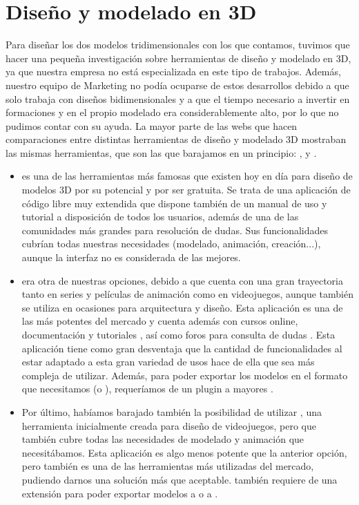 \documentclass{subfiles}
\begin{document}
  \chapter{Diseño y modelado en 3D}
  \label{chap:4}

    Para diseñar los dos modelos tridimensionales con los que contamos, tuvimos que hacer una pequeña investigación sobre herramientas de diseño y modelado en 3D, ya que nuestra empresa no está especializada en este tipo de trabajos. Además, nuestro equipo de Marketing no podía ocuparse de estos desarrollos debido a que solo trabaja con diseños bidimensionales y a que el tiempo necesario a invertir en formaciones y en el propio modelado era considerablemente alto, por lo que no pudimos contar con su ayuda. La mayor parte de las webs que hacen comparaciones entre distintas herramientas de diseño y modelado 3D mostraban las mismas herramientas, que son las que barajamos en un principio: \blender \cite{web:blender}, \unreal \cite{web:unreal} y \unity \cite{web:unity}.

    \begin{itemize}
        \item \textbf{\blender} es una de las herramientas más famosas que existen hoy en día para diseño de modelos 3D por su potencial y por ser gratuita. Se trata de una aplicación de código libre muy extendida que dispone también de un manual de uso y tutorial \cite{web:blender_manual} a disposición de todos los usuarios, además de una de las comunidades más grandes para resolución de dudas. Sus funcionalidades cubrían todas nuestras necesidades (modelado, animación, creación...), aunque la interfaz no es considerada de las mejores.
        
        \item \textbf{\unreal} era otra de nuestras opciones, debido a que cuenta con una gran trayectoria tanto en series y películas de animación como en videojuegos, aunque también se utiliza en ocasiones para arquitectura y diseño. Esta aplicación es una de las más potentes del mercado y cuenta además con cursos online, documentación y tutoriales \cite{web:unreal_learn}, así como foros para consulta de dudas \cite{web:unreal_forum}. Esta aplicación tiene como gran desventaja que la cantidad de funcionalidades al estar adaptado a esta gran variedad de usos hace de ella que sea más compleja de utilizar. Además, para poder exportar los modelos en el formato que necesitamos (\gltf o \glb), requeríamos de un plugin a mayores \cite{web:unreal_plugin}.
        
        \item Por último, habíamos barajado también la posibilidad de utilizar \textbf{\unity}, una herramienta inicialmente creada para diseño de videojuegos, pero que también cubre todas las necesidades de modelado y animación que necesitábamos. Esta aplicación es algo menos potente que la anterior opción, pero también es una de las herramientas más utilizadas del mercado, pudiendo darnos una solución más que aceptable. \unity también requiere de una extensión para poder exportar modelos a \glb o a \gltf \cite{web:unity_plugin}.
    \end{itemize}
\end{document}
